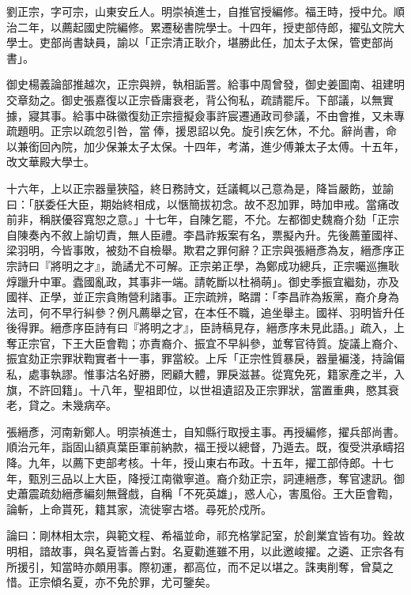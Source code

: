 \begin{pinyinscope}
劉正宗，字可宗，山東安丘人。明崇禎進士，自推官授編修。福王時，授中允。順治二年，以薦起國史院編修。累遷秘書院學士。十四年，授吏部侍郎，擢弘文院大學士。吏部尚書缺員，諭以「正宗清正耿介，堪勝此任，加太子太保，管吏部尚書」。

御史楊義論部推越次，正宗與辨，執相詬詈。給事中周曾發，御史姜圖南、祖建明交章劾之。御史張嘉復以正宗昏庸衰老，背公徇私，疏請罷斥。下部議，以無實據，寢其事。給事中硃徽復劾正宗擅擬僉事許宸遷通政司參議，不由會推，又未專疏題明。正宗以疏忽引咎，當俸，援恩詔以免。旋引疾乞休，不允。辭尚書，命以兼銜回內院，加少保兼太子太保。十四年，考滿，進少傅兼太子太傅。十五年，改文華殿大學士。

十六年，上以正宗器量狹隘，終日務詩文，廷議輒以己意為是，降旨嚴飭，並諭曰：「朕委任大臣，期始終相成，以愜簡拔初念。故不忍加罪，時加申戒。當痛改前非，稱朕優容寬恕之意。」十七年，自陳乞罷，不允。左都御史魏裔介劾「正宗自陳奏內不敘上諭切責，無人臣禮。李昌祚叛案有名，票擬內升。先後薦董國祥、梁羽明，今皆事敗，被劾不自檢舉。欺君之罪何辭？正宗與張縉彥為友，縉彥序正宗詩曰『將明之才』，詭譎尤不可解。正宗弟正學，為鄭成功總兵，正宗囑巡撫耿焞躐升中軍。蠹國亂政，其事非一端。請乾斷以杜禍萌」。御史季振宜繼劾，亦及國祥、正學，並正宗貪賄營利諸事。正宗疏辨，略謂：「李昌祚為叛黨，裔介身為法司，何不早行糾參？例凡薦舉之官，在本任不職，追坐舉主。國祥、羽明皆升任後得罪。縉彥序臣詩有曰『將明之才』，臣詩稿見存，縉彥序未見此語。」疏入，上奪正宗官，下王大臣會鞫；亦責裔介、振宜不早糾參，並奪官待質。旋議上裔介、振宜劾正宗罪狀鞫實者十一事，罪當絞。上斥「正宗性質暴戾，器量褊淺，持論偏私，處事執謬。惟事沽名好勝，罔顧大體，罪戾滋甚。從寬免死，籍家產之半，入旗，不許回籍」。十八年，聖祖即位，以世祖遺詔及正宗罪狀，當置重典，愍其衰老，貸之。未幾病卒。

張縉彥，河南新鄭人。明崇禎進士，自知縣行取授主事。再授編修，擢兵部尚書。順治元年，詣固山額真葉臣軍前納款，福王授以總督，乃遁去。既，復受洪承疇招降。九年，以薦下吏部考核。十年，授山東右布政。十五年，擢工部侍郎。十七年，甄別三品以上大臣，降授江南徽寧道。裔介劾正宗，詞連縉彥，奪官逮訊。御史蕭震疏劾縉彥編刻無聲戲，自稱「不死英雄」，惑人心，害風俗。王大臣會鞫，論斬，上命貰死，籍其家，流徙寧古塔。尋死於戍所。

論曰：剛林相太宗，與範文程、希福並命，祁充格掌記室，於創業宜皆有功。銓故明相，諳故事，與名夏皆善占對。名夏勸進雖不用，以此邀峻擢。之遴、正宗各有所援引，知當時亦頗用事。際初運，都高位，而不足以堪之。誅夷削奪，曾莫之惜。正宗傾名夏，亦不免於罪，尤可鑒矣。


\end{pinyinscope}
